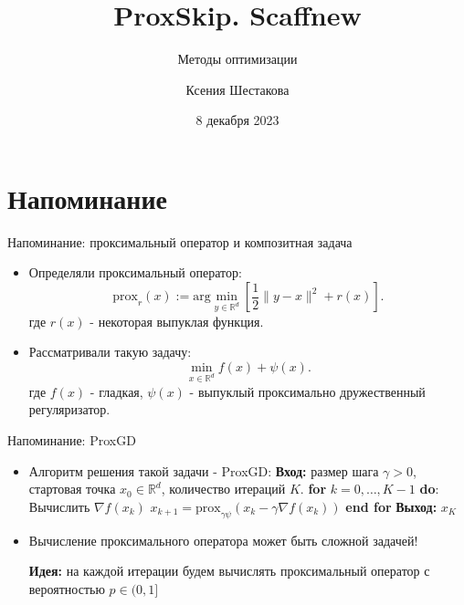 \documentclass[russian,xcolor=dvipsnames]{beamer}
\title[Дополнительный семинар]{ProxSkip. Scaffnew}
\subtitle{Методы оптимизации}
\author[Ксения Шестакова]{Ксения Шестакова}
\date[8 декабря 2023]{8 декабря 2023}
\institute[]{Московский физико-технический институт}
\newcommand{\R}{\mathbb{R}}
\begin{document}
\begin{frame}
	\titlepage
\end{frame}

\section{Напоминание}

\begin{frame}{Напоминание: проксимальный оператор и композитная задача}
\begin{itemize}

\item Определяли проксимальный оператор:
$$ \text{prox}_{r}(x) := \text{arg} \min_{y \in \mathbb{R}^d} \left[ \frac12 \| y - x \|^2 + r(x) \right]. $$
где $r(x)$ - некоторая выпуклая функция.
 
\pause

\item Рассматривали такую задачу:
$$
\min_{x \in \R^d} f(x) + \psi(x).
$$
где $f(x)$ - гладкая, $\psi(x)$ - выпуклый проксимально дружественный регуляризатор.

\end{itemize}
\end{frame}

\begin{frame}{Напоминание: ProxGD}
\begin{itemize}
\item Алгоритм решения такой задачи - ProxGD: \newline
\textbf{Вход:} размер шага $\gamma > 0$, стартовая точка $x_0 \in \mathbb{R}^d$, количество итераций $K$.
\newline 
\textbf{for} $k=0,\dots, K - 1$ \textbf{do}: \newline
\hspace*{3} Вычислить $\nabla f(x_k)$ \newline
\hspace*{3} $x_{k+1} = \text{prox}_{\gamma \psi}(x_k - \gamma \nabla f(x_k))$ \newline
\textbf{end for} \newline
\textbf{Выход:} $x_K$

\pause

\item Вычисление проксимального оператора может быть сложной задачей! \newline

\pause
\textbf{Идея:} на каждой итерации будем вычислять проксимальный оператор с вероятностью $p \in (0, 1]$
\end{itemize}
\end{frame}
\end{document}
